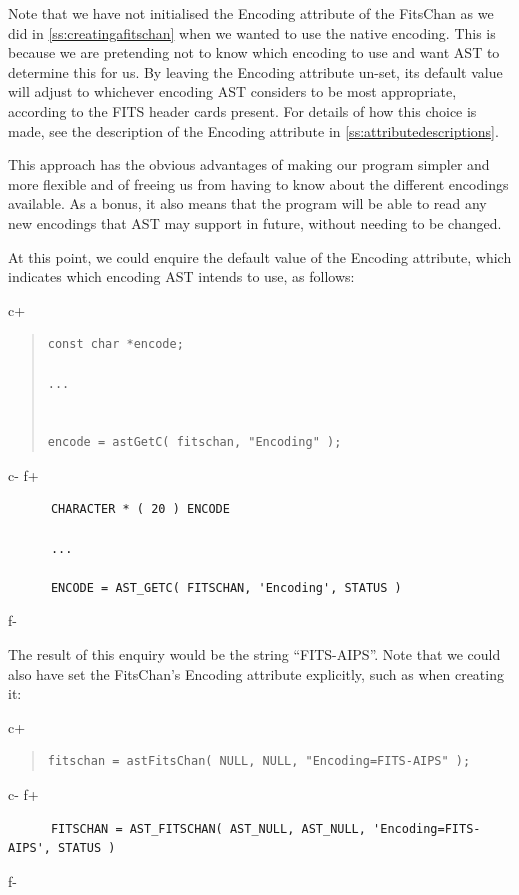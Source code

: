 \documentclass[twoside,11pt]{article}
\newcommand{\appref}[1]{Appendix~\ref{#1}}
\newcommand{\secref}[1]{\S\ref{#1}}
\renewcommand{\appref}[1]{\ref{#1}}
\renewcommand{\secref}[1]{\ref{#1}}
\begin{document}
Note that we have not initialised the Encoding attribute of the
FitsChan as we did in \secref{ss:creatingafitschan} when we wanted to
use the native encoding. This is because we are pretending not to know
which encoding to use and want AST to determine this for us. By
leaving the Encoding attribute un-set, its default value will adjust
to whichever encoding AST considers to be most appropriate, according
to the FITS header cards present. For details of how this choice is
made, see the description of the Encoding attribute in
\appref{ss:attributedescriptions}.

This approach has the obvious advantages of making our program simpler
and more flexible and of freeing us from having to know about the
different encodings available. As a bonus, it also means that the
program will be able to read any new encodings that AST may support in
future, without needing to be changed.

At this point, we could enquire the default value of the Encoding
attribute, which indicates which encoding AST intends to use, as
follows:

c+
\begin{quote}
\small
\begin{verbatim}
const char *encode;

...


encode = astGetC( fitschan, "Encoding" );
\end{verbatim}
\normalsize
\end{quote}
c-
f+
\small
\begin{verbatim}
      CHARACTER * ( 20 ) ENCODE

      ...

      ENCODE = AST_GETC( FITSCHAN, 'Encoding', STATUS )
\end{verbatim}
\normalsize
f-

The result of this enquiry would be the string ``FITS-AIPS''.  Note
that we could also have set the FitsChan's Encoding attribute
explicitly, such as when creating it:

c+
\begin{quote}
\small
\begin{verbatim}
fitschan = astFitsChan( NULL, NULL, "Encoding=FITS-AIPS" );
\end{verbatim}
\normalsize
\end{quote}
c-
f+
\small
\begin{verbatim}
      FITSCHAN = AST_FITSCHAN( AST_NULL, AST_NULL, 'Encoding=FITS-AIPS', STATUS )
\end{verbatim}
\normalsize
f-
\end{document}
